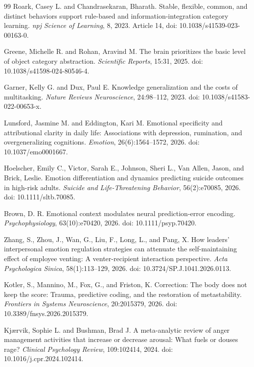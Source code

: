 \documentclass[11pt]{article}
\begin{document}
\begin{thebibliography}{99}
Roark, Casey L. and Chandrasekaran, Bharath.
\newblock Stable, flexible, common, and distinct behaviors support rule-based and information-integration category learning.
\newblock \emph{npj Science of Learning}, 8, 2023.
\newblock Article 14, doi: 10.1038/s41539-023-00163-0.

Greene, Michelle R. and Rohan, Aravind M.
\newblock The brain prioritizes the basic level of object category abstraction.
\newblock \emph{Scientific Reports}, 15:31, 2025.
\newblock doi: 10.1038/s41598-024-80546-4.

Garner, Kelly G. and Dux, Paul E.
\newblock Knowledge generalization and the costs of multitasking.
\newblock \emph{Nature Reviews Neuroscience}, 24:98--112, 2023.
\newblock doi: 10.1038/s41583-022-00653-x.

Lunsford, Jasmine M. and Eddington, Kari M.
\newblock Emotional specificity and attributional clarity in daily life: Associations with depression, rumination, and overgeneralizing cognitions.
\newblock \emph{Emotion}, 26(6):1564--1572, 2026.
\newblock doi: 10.1037/emo0001667.

Hoelscher, Emily C., Victor, Sarah E., Johnson, Sheri L., Van Allen, Jason, and Brick, Leslie.
\newblock Emotion differentiation and dynamics predicting suicide outcomes in high-risk adults.
\newblock \emph{Suicide and Life-Threatening Behavior}, 56(2):e70085, 2026.
\newblock doi: 10.1111/sltb.70085.

Brown, D. R.
\newblock Emotional context modulates neural prediction-error encoding.
\newblock \emph{Psychophysiology}, 63(10):e70420, 2026.
\newblock doi: 10.1111/psyp.70420.

Zhang, S., Zhou, J., Wan, G., Liu, F., Long, L., and Pang, X.
\newblock How leaders' interpersonal emotion regulation strategies can attenuate the self-maintaining effect of employee venting: A venter-recipient interaction perspective.
\newblock \emph{Acta Psychologica Sinica}, 58(1):113--129, 2026.
\newblock doi: 10.3724/SP.J.1041.2026.0113.

Kotler, S., Mannino, M., Fox, G., and Friston, K.
\newblock Correction: The body does not keep the score: Trauma, predictive coding, and the restoration of metastability.
\newblock \emph{Frontiers in Systems Neuroscience}, 20:2015379, 2026.
\newblock doi: 10.3389/fnsys.2026.2015379.

Kj{\ae}rvik, Sophie L. and Bushman, Brad J.
\newblock A meta-analytic review of anger management activities that increase or decrease arousal: What fuels or douses rage?
\newblock \emph{Clinical Psychology Review}, 109:102414, 2024.
\newblock doi: 10.1016/j.cpr.2024.102414.

\end{thebibliography}
\end{document}
